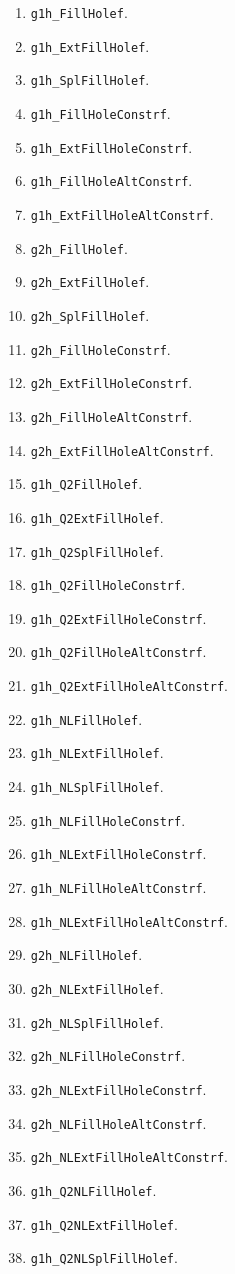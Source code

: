 \begin{enumerate}
\item \texttt{g1h\_FillHolef}.
\item \texttt{g1h\_ExtFillHolef}.
\item \texttt{g1h\_SplFillHolef}.
\item \texttt{g1h\_FillHoleConstrf}.
\item \texttt{g1h\_ExtFillHoleConstrf}.
\addtocounter{enumi}{1}
\item \texttt{g1h\_FillHoleAltConstrf}.
\item \texttt{g1h\_ExtFillHoleAltConstrf}.
\addtocounter{enumi}{1}
\item \texttt{g2h\_FillHolef}.
\item \texttt{g2h\_ExtFillHolef}.
\item \texttt{g2h\_SplFillHolef}.
\item \texttt{g2h\_FillHoleConstrf}.
\item \texttt{g2h\_ExtFillHoleConstrf}.
\addtocounter{enumi}{1}
\item \texttt{g2h\_FillHoleAltConstrf}.
\item \texttt{g2h\_ExtFillHoleAltConstrf}.
\addtocounter{enumi}{1}
\item \texttt{g1h\_Q2FillHolef}.
\item \texttt{g1h\_Q2ExtFillHolef}.
\item \texttt{g1h\_Q2SplFillHolef}.
\item \texttt{g1h\_Q2FillHoleConstrf}.
\item \texttt{g1h\_Q2ExtFillHoleConstrf}.
\addtocounter{enumi}{1}
\item \texttt{g1h\_Q2FillHoleAltConstrf}.
\item \texttt{g1h\_Q2ExtFillHoleAltConstrf}.
\addtocounter{enumi}{1}
\item \texttt{g1h\_NLFillHolef}.
\item \texttt{g1h\_NLExtFillHolef}.
\item \texttt{g1h\_NLSplFillHolef}.
\item \texttt{g1h\_NLFillHoleConstrf}.
\item \texttt{g1h\_NLExtFillHoleConstrf}.
\addtocounter{enumi}{1}
\item \texttt{g1h\_NLFillHoleAltConstrf}.
\item \texttt{g1h\_NLExtFillHoleAltConstrf}.
\addtocounter{enumi}{1}
\item \texttt{g2h\_NLFillHolef}.
\item \texttt{g2h\_NLExtFillHolef}.
\item \texttt{g2h\_NLSplFillHolef}.
\item \texttt{g2h\_NLFillHoleConstrf}.
\item \texttt{g2h\_NLExtFillHoleConstrf}.
\addtocounter{enumi}{1}
\item \texttt{g2h\_NLFillHoleAltConstrf}.
\item \texttt{g2h\_NLExtFillHoleAltConstrf}.
\addtocounter{enumi}{1}
\item \texttt{g1h\_Q2NLFillHolef}.
\item \texttt{g1h\_Q2NLExtFillHolef}.
\item \texttt{g1h\_Q2NLSplFillHolef}.
\end{enumerate}

